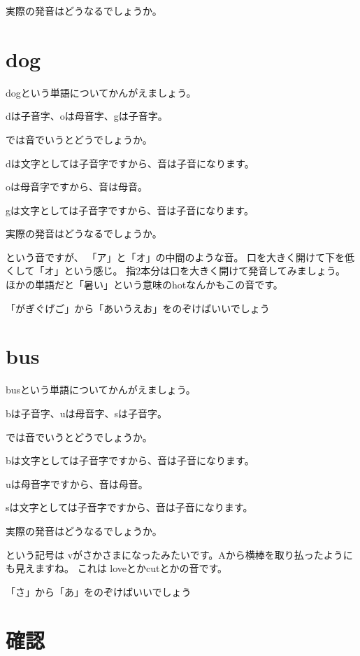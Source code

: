 \documentclass[book,jafontscale=0.9247]{jlreq}
\let\textipa\relax
\begin{document}
実際の発音はどうなるでしょうか。

\textipa{/s/}
\textipa{/I/}
\textipa{/t/}

\section{dog}

dogという単語についてかんがえましょう。

dは子音字、oは母音字、gは子音字。

では音でいうとどうでしょうか。

dは文字としては子音字ですから、音は子音になります。

oは母音字ですから、音は母音。

gは文字としては子音字ですから、音は子音になります。

実際の発音はどうなるでしょうか。

\textipa{/\textscripta /}という音ですが、
「ア」と「オ」の中間のような音。
口を大きく開けて下を低くして「オ」という感じ。
指2本分は口を大きく開けて発音してみましょう。
ほかの単語だと「暑い」という意味のhotなんかもこの音です。


\textipa{/d}
\textipa{/\textscripta /}
\textipa{/g/}「がぎぐげご」から「あいうえお」をのぞけばいいでしょう

\section{bus}

busという単語についてかんがえましょう。

bは子音字、uは母音字、sは子音字。

では音でいうとどうでしょうか。

bは文字としては子音字ですから、音は子音になります。

uは母音字ですから、音は母音。

sは文字としては子音字ですから、音は子音になります。

実際の発音はどうなるでしょうか。

\textipa{/\textturnv}という記号は
vがさかさまになったみたいです。Aから横棒を取り払ったようにも見えますね。
これは
loveとかcutとかの音です。


\textipa{/b/}
\textipa{/\textturnv}
\textipa{/s/}「さ」から「あ」をのぞけばいいでしょう

\section{確認}
\end{document}
